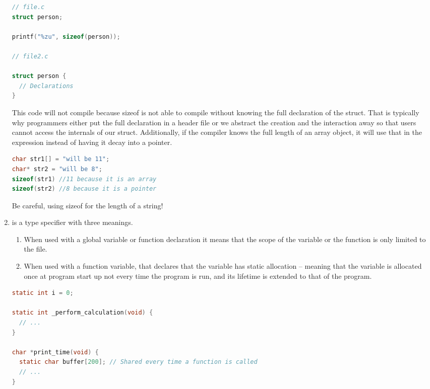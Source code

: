 \begin{enumerate}
	      \begin{lstlisting}[language=C]
// file.c
struct person;

printf("%zu", sizeof(person));

// file2.c

struct person {
  // Declarations
}
\end{lstlisting}

	      This code will not compile because sizeof is not able to compile  without knowing the full declaration of the  struct.
        That is typically why programmers either put the full declaration in a header file or we abstract the creation and the interaction away so that users cannot access the internals of our struct.
        Additionally, if the compiler knows the full length of an array object, it will use that in the expression instead of having it decay into a pointer.

	      \begin{lstlisting}[language=C]
char str1[] = "will be 11";
char* str2 = "will be 8";
sizeof(str1) //11 because it is an array
sizeof(str2) //8 because it is a pointer
\end{lstlisting}

	      Be careful, using sizeof for the length of a string!

	\item {} is a type specifier with three meanings.

	      \begin{enumerate}
		      \item When used with a global variable or function declaration it means that the scope of the variable or the function is only limited to the file.
		      \item When used with a function variable, that declares that the variable has static allocation -- meaning that the variable is allocated once at program start up not every time the program is run, and its lifetime is extended to that of the program.
	      \end{enumerate}

	      \begin{lstlisting}[language=C]
static int i = 0;

static int _perform_calculation(void) {
  // ...
}

char *print_time(void) {
  static char buffer[200]; // Shared every time a function is called
  // ...
}
\end{lstlisting}


\end{enumerate}
